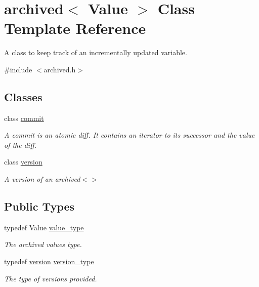 \hypertarget{classarchived}{}\section{archived$<$ Value $>$ Class Template Reference}
\label{classarchived}


A class to keep track of an incrementally updated variable.  




{\ttfamily \#include $<$archived.\+h$>$}

\subsection*{Classes}
\begin{DoxyCompactItemize}
\item 
class \hyperlink{classarchived_1_1commit}{commit}
\begin{DoxyCompactList}\small\item\em A commit is an atomic diff. It contains an iterator to its successor and the value of the diff. \end{DoxyCompactList}\item 
class \hyperlink{classarchived_1_1version}{version}
\begin{DoxyCompactList}\small\item\em A version of an archived$<$$>$ \end{DoxyCompactList}\end{DoxyCompactItemize}
\subsection*{Public Types}
\begin{DoxyCompactItemize}
\item 
typedef Value \hyperlink{classarchived_a0f6c13c55e504fe3bbfc04f3896e5abc}{value\+\_\+type}
\begin{DoxyCompactList}\small\item\em The archived value\textquotesingle{}s type. \end{DoxyCompactList}\item 
typedef \hyperlink{classarchived_1_1version}{version} \hyperlink{classarchived_a75b8e571e7c6aca9432b9aa2ba601c00}{version\+\_\+type}
\begin{DoxyCompactList}\small\item\em The type of versions provided. \end{DoxyCompactList}\end{DoxyCompactItemize}
